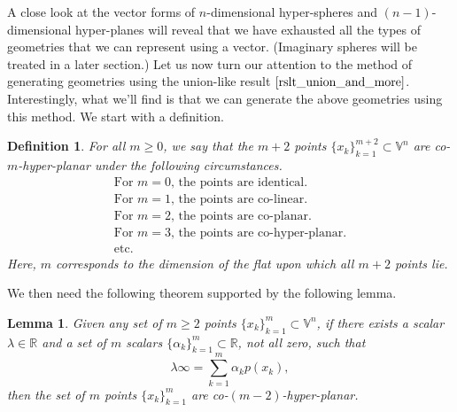 \documentclass[12pt]{article}
\newcommand{\V}{\mathbb{V}}
\newcommand{\R}{\mathbb{R}}
\newcommand{\nvai}{\infty}
\newtheorem{definition}{Definition}[section]
\newtheorem{lemma}{Lemma}[section]
\begin{document}
A close look at the vector forms of $n$-dimensional hyper-spheres and $(n-1)$-dimensional
hyper-planes will reveal that we have exhausted all the types of geometries that we can
represent using a vector.  (Imaginary spheres will be treated in a later section.)
Let us now turn our attention to the method of generating
geometries using the union-like result $\eqref{rslt_union_and_more}$.  Interestingly, what we'll
find is that we can generate the above geometries using this method.
We start with a definition.
\begin{definition}\label{def_co_hyper_planar}
For all $m\geq 0$, we say that the $m+2$ points $\{x_k\}_{k=1}^{m+2}\subset\V^n$
are co-$m$-hyper-planar under the following circumstances.
\begin{equation*}
\begin{array}{l}
\mbox{For $m=0$, the points are identical.} \\
\mbox{For $m=1$, the points are co-linear.} \\
\mbox{For $m=2$, the points are co-planar.} \\
\mbox{For $m=3$, the points are co-hyper-planar.} \\
\mbox{etc.}
\end{array}
\end{equation*}
Here, $m$ corresponds to the dimension of the flat upon which all $m+2$
points lie.
\end{definition}
We then need the following theorem supported by the following lemma.
\begin{lemma}\label{lma_lin_combo_points_is_inf}
Given any set of $m\geq 2$ points $\{x_k\}_{k=1}^m\subset\V^n$, if there exists
a scalar $\lambda\in\R$ and a set of $m$ scalars $\{\alpha_k\}_{k=1}^m\subset\R$, not all zero, such that
\begin{equation*}
\lambda\nvai = \sum_{k=1}^m\alpha_k p(x_k),
\end{equation*}
then the set of $m$ points $\{x_k\}_{k=1}^m$ are co-$(m-2)$-hyper-planar.
\end{lemma}
\end{document}
